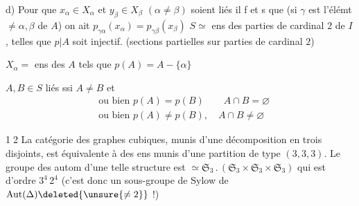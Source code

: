 d) Pour que $x_\alpha\in X_\alpha$ et $y_\beta\in X_\beta$ $(\alpha\ne\beta)$ soient liés il f et s que (si $\gamma$  est l'élémt $\ne\alpha,\beta$ de $A$) on ait $p_{\gamma\alpha}(x_\alpha)=p_{\gamma\beta}(x_\beta)$
$S\simeq$ ens des parties  de cardinal $2$ de $I$, telles que $p|A$ soit injectif. (sections partielles sur parties de cardinal $2$)

$X_\alpha=$ ens des $A$ tels que $p(A)=A-\{\alpha\}$

$A,B\in S$ liés ssi $A\ne B$ et
\[
\begin{aligned}
 &\text{ou bien }p(A)=p(B)\qquad A\cap B=\varnothing\\
 &\text{ou bien }p(A)\ne p(B),\quad A\cap B\ne\varnothing
\end{aligned}
\]

\textcircled{\scriptsize 12} La catégorie des graphes cubiques, munis d'une décomposition en trois   disjoints, est équivalente à   des ens  munis d'une partition de type $(3,3,3)$. Le groupe des autom d'une telle structure est $\simeq\mathfrak S_3\mathbin{.}(\mathfrak S_3\times\mathfrak S_3\times\mathfrak S_3)$ qui est d'ordre $3^4\,2^4$ (c'est donc  un sous-groupe de Sylow de $\mathrm{Aut}(\Delta)\deleted{\unsure{\ne2}}$ !)


